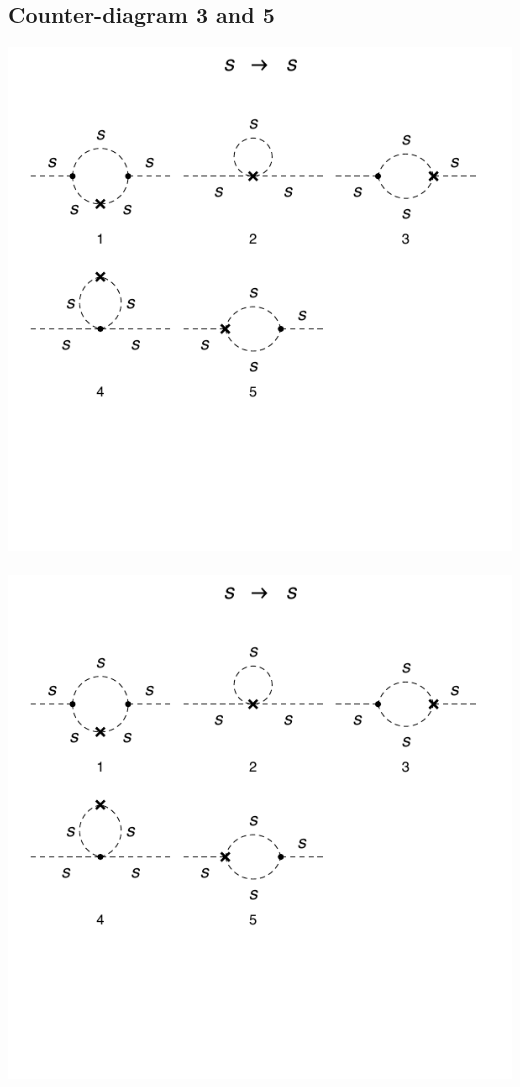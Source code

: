 \documentclass[11pt]{article}
\begin{document}
   \subsection*{Counter-diagram 3 and 5}
 \begin{center}
\includegraphics{2loop_3c.pdf} \ \ \ \ \ \ \ \includegraphics{2loop_5c.pdf}
\end{center}
\end{document}
